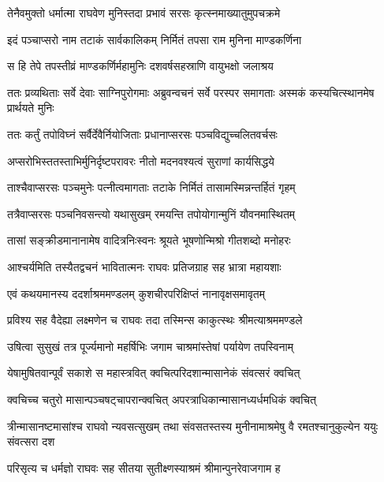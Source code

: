 \twolineshloka
{तेनैवमुक्तो धर्मात्मा राघवेण मुनिस्तदा}
{प्रभावं सरसः कृत्स्नमाख्यातुमुपचक्रमे} %

\twolineshloka
{इदं पञ्चाप्सरो नाम तटाकं सार्वकालिकम्}
{निर्मितं तपसा राम मुनिना माण्डकर्णिना} %

\twolineshloka
{स हि तेपे तपस्तीव्रं माण्डकर्णिर्महामुनिः}
{दशवर्षसहस्राणि वायुभक्षो जलाश्रय} %

\threelineshloka
{ततः प्रव्यथिताः सर्वे देवाः साग्निपुरोगमाः}
{अब्रुवन्वचनं सर्वे परस्पर समागताः}
{अस्मकं कस्यचित्स्थानमेष प्रार्थयते मुनिः} %

\twolineshloka
{ततः कर्तुं तपोविघ्नं सर्वैर्देवैर्नियोजिताः}
{प्रधानाप्सरसः पञ्चविद्युच्चलितवर्चसः} %

\twolineshloka
{अप्सरोभिस्ततस्ताभिर्मुनिर्दृष्टपरावरः}
{नीतो मदनवश्यत्वं सुराणां कार्यसिद्धये} %

\twolineshloka
{ताश्चैवाप्सरसः पञ्चमुनेः पत्नीत्वमागताः}
{तटाके निर्मितं तासामस्मिन्नन्तर्हितं गृहम्} %

\twolineshloka
{तत्रैवाप्सरसः पञ्चनिवसन्त्यो यथासुखम्}
{रमयन्ति तपोयोगान्मुनिं यौवनमास्थितम्} %

\twolineshloka
{तासां सङ्क्रीडमानानामेष वादित्रनिःस्वनः}
{श्रूयते भूषणोन्मिश्रो गीतशब्दो मनोहरः} %

\twolineshloka
{आश्चर्यमिति तस्यैतद्वचनं भावितात्मनः}
{राघवः प्रतिजग्राह सह भ्रात्रा महायशाः} %

\twolineshloka
{एवं कथयमानस्य ददर्शाश्रममण्डलम्}
{कुशचीरपरिक्षिप्तं नानावृक्षसमावृतम्} %

\twolineshloka
{प्रविश्य सह वैदेह्या लक्ष्मणेन च राघवः}
{तदा तस्मिन्स काकुत्स्थः श्रीमत्याश्रममण्डले} %

\twolineshloka
{उषित्वा सुसुखं तत्र पूर्ज्यमानो महर्षिभिः}
{जगाम चाश्रमांस्तेषां पर्यायेण तपस्विनाम्} %

\twolineshloka
{येषामुषितवान्पूर्वं सकाशे स महास्त्रवित्}
{क्वचित्परिदशान्मासानेकं संवत्सरं क्वचित्} %

\twolineshloka
{क्वचिच्च चतुरो मासान्पञ्चषट्चापरान्क्वचित्}
{अपरत्राधिकान्मासानध्यर्धमधिकं क्वचित्} %

\threelineshloka
{त्रीन्मासानष्टमासांश्च राघवो न्यवसत्सुखम्}
{तथा संवसतस्तस्य मुनीनामाश्रमेषु वै}
{रमतश्चानुकुल्येन ययुः संवत्सरा दश} %

\twolineshloka
{परिसृत्य च धर्मज्ञो राघवः सह सीतया}
{सुतीक्ष्णस्याश्रमं श्रीमान्पुनरेवाजगाम ह} %


